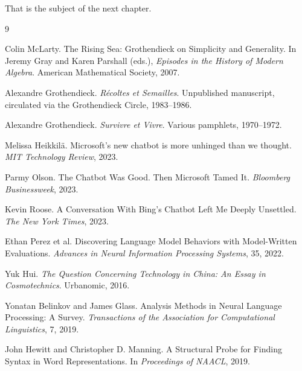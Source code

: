 \documentclass[12pt,a4paper]{article}
\begin{document}
That is the subject of the next chapter.


\begin{thebibliography}{9}

Colin McLarty.
\newblock The Rising Sea: Grothendieck on Simplicity and Generality.
\newblock In Jeremy Gray and Karen Parshall (eds.), \emph{Episodes in the History of Modern Algebra}. American Mathematical Society, 2007.

Alexandre Grothendieck.
\newblock \emph{R\'ecoltes et Semailles}.
\newblock Unpublished manuscript, circulated via the Grothendieck Circle, 1983--1986.

Alexandre Grothendieck.
\newblock \emph{Survivre et Vivre}.
\newblock Various pamphlets, 1970--1972.

Melissa Heikkil\"a.
\newblock Microsoft's new chatbot is more unhinged than we thought.
\newblock \emph{MIT Technology Review}, 2023.

Parmy Olson.
\newblock The Chatbot Was Good. Then Microsoft Tamed It.
\newblock \emph{Bloomberg Businessweek}, 2023.

Kevin Roose.
\newblock A Conversation With Bing's Chatbot Left Me Deeply Unsettled.
\newblock \emph{The New York Times}, 2023.

Ethan Perez et al.
\newblock Discovering Language Model Behaviors with Model-Written Evaluations.
\newblock \emph{Advances in Neural Information Processing Systems}, 35, 2022.

Yuk Hui.
\newblock \emph{The Question Concerning Technology in China: An Essay in Cosmotechnics}.
\newblock Urbanomic, 2016.

Yonatan Belinkov and James Glass.
\newblock Analysis Methods in Neural Language Processing: A Survey.
\newblock \emph{Transactions of the Association for Computational Linguistics}, 7, 2019.

John Hewitt and Christopher D. Manning.
\newblock A Structural Probe for Finding Syntax in Word Representations.
\newblock In \emph{Proceedings of NAACL}, 2019.

\end{thebibliography}
\end{document}

